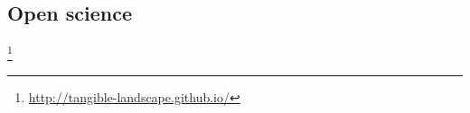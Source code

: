 \documentclass[prodmode,acmtochi]{acmsmall} %
\newcommand{\urlhttp}[1]{\href{http://#1}{\nolinkurl{#1}}}
\newcommand{\urlhttps}[1]{\href{https://#1}{\nolinkurl{#1}}}
\begin{document}
	

\subsection{Open science}




%



\footnote{\url{http://tangible-landscape.github.io/}}
\end{document}
